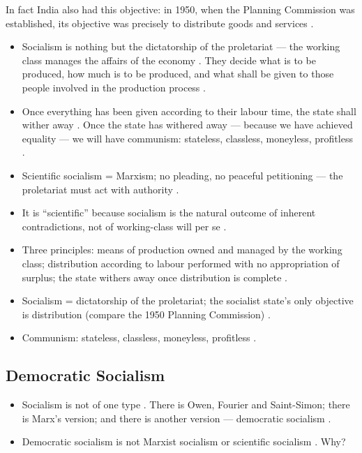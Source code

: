 \begin{GovtPolicy}
In fact India also had this objective: in 1950, when the Planning Commission was established, its objective was precisely to distribute goods and services .
\end{GovtPolicy}

\begin{itemize}
    \item Socialism is nothing but the dictatorship of the proletariat --- the working class manages the affairs of the economy . They decide what is to be produced, how much is to be produced, and what shall be given to those people involved in the production process .
    \item Once everything has been given according to their labour time, the state shall wither away . Once the state has withered away --- because we have achieved equality --- we will have communism: stateless, classless, moneyless, profitless .
\end{itemize}

\begin{QuickRevision}
\begin{itemize}
    \item Scientific socialism = Marxism; no pleading, no peaceful petitioning --- the proletariat must act with authority .
    \item It is ``scientific'' because socialism is the natural outcome of inherent contradictions, not of working-class will per se .
    \item Three principles: means of production owned and managed by the working class; distribution according to labour performed with no appropriation of surplus; the state withers away once distribution is complete .
    \item Socialism = dictatorship of the proletariat; the socialist state's only objective is distribution (compare the 1950 Planning Commission) .
    \item Communism: stateless, classless, moneyless, profitless .
\end{itemize}
\end{QuickRevision}

\subsection{Democratic Socialism}
\begin{itemize}
    \item Socialism is not of one type . There is Owen, Fourier and Saint-Simon; there is Marx's version; and there is another version --- democratic socialism .
    \item Democratic socialism is not Marxist socialism or scientific socialism . Why? 
\end{itemize}

